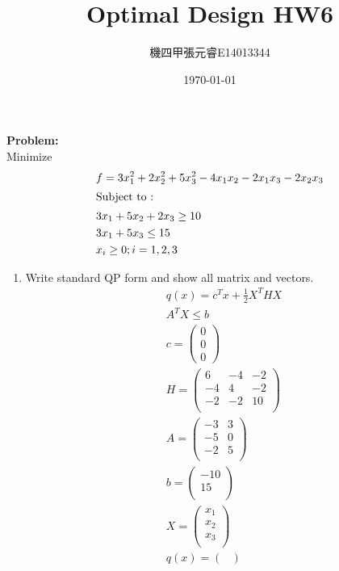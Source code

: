 \documentclass[12pt,a4paper]{report}
\title{Optimal Design HW6}
\author{機四甲\hspace{5mm}張元睿\hspace{5mm}E14013344}
\date{\today}
\begin{document}
	\begin{CJK}{UTF8}{bsmi}
	\maketitle 

{\bf Problem:}\\
Minimize
\begin{align*}
&f=3x_1^2+2x_2^2+5x_3^2-4x_1x_2-2x_1x_3-2x_2x_3\\
\intertext{Subject to :}
&3x_1+5x_2+2x_3\geq10\\
&3x_1+5x_3\leq15\\
&x_i\geq0; i=1,2,3
\end{align*}

\begin{enumerate}%
	\item Write standard QP form and show all matrix and vectors.
\begin{align*}
	&q(x) = c^Tx+\frac12X^THX \\
	&A^TX \leq b \\
	&c=
	\begin{pmatrix}
	0\\0\\0
	\end{pmatrix}\\
	&H=	
	\begin{pmatrix}
	6 &-4 &-2\\
	-4 &4 &-2\\
	-2 &-2& 10\\
	\end{pmatrix}\\
	&A=
		\begin{pmatrix}
		-3& 3 \\
		-5& 0 \\
		-2& 5 \\
		\end{pmatrix}\\
	&b=
		\begin{pmatrix}
		-10 \\
		15 \\
		\end{pmatrix}\\
	&X=
		\begin{pmatrix}
		x_1 \\
		x_2\\
		x_3\\
		\end{pmatrix}\\
		&q(x) =
		\begin{pmatrix}

\end{pmatrix}
\end{align*}
\end{enumerate}
\end{CJK}
\end{document}
